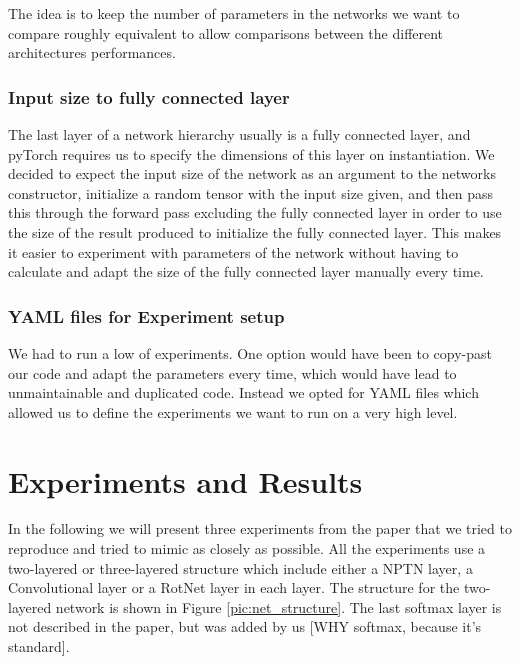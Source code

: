 \documentclass{llncs}
\begin{document}
The idea is to keep the number of parameters in the networks we want to compare roughly equivalent to allow comparisons between the different architectures performances.


\subsubsection{Input size to fully connected layer}
The last layer of a network hierarchy usually is a fully connected layer, and pyTorch requires us to specify the dimensions of this layer on instantiation. We decided to expect the input size of the network as an argument to the networks constructor, initialize a random tensor with the input size given, and then pass this through the forward pass excluding the fully connected layer in order to use the size of the result produced to initialize the fully connected layer. This makes it easier to experiment with parameters of the network without having to calculate and adapt the size of the fully connected layer manually every time. 

\subsubsection{YAML files for Experiment setup}
We had to run a low of experiments. One option would have been to copy-past our code and adapt the parameters every time, which would have lead to unmaintainable and duplicated code. Instead we opted for YAML files which allowed us to define the experiments we want to run on a very high level.

\section{Experiments and Results}	
In the following we will present three experiments from the paper that we tried to reproduce and tried to mimic as closely as possible. 
All the experiments use a two-layered or three-layered structure which include either a NPTN layer, a Convolutional layer or a RotNet layer in each layer. The structure for the two-layered network is shown in Figure \ref{pic:net_structure}. The last softmax layer is not described in the paper, but was added by us [WHY softmax, because it's standard]. 
\end{document}
